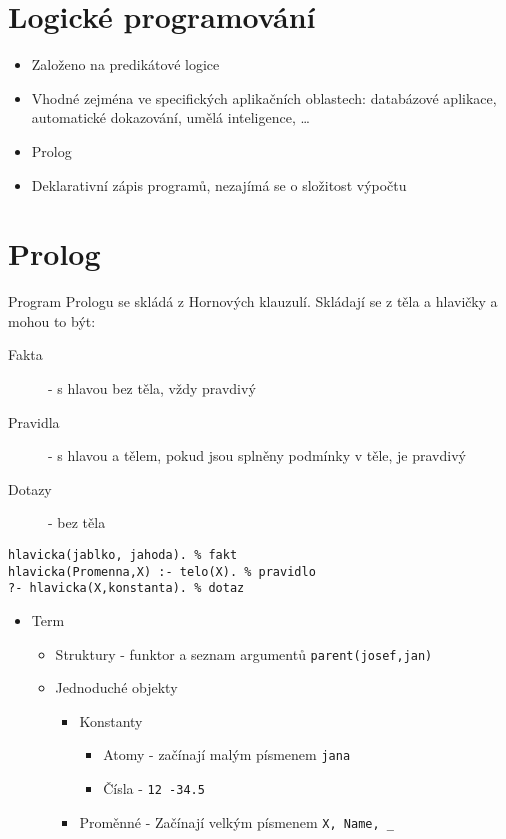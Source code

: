 \documentclass{szzclass}
\begin{document}
\section{Logické programování}

\begin{itemize}
\item Založeno na predikátové logice
\item Vhodné zejména ve specifických aplikačních oblastech: databázové aplikace, automatické dokazování, umělá inteligence, \dots
\item Prolog
\item Deklarativní zápis programů, nezajímá se o složitost výpočtu
\end{itemize}

\section{Prolog}
Program Prologu se skládá z Hornových klauzulí. Skládají se z těla a hlavičky a mohou to být:
\begin{description}
\item[Fakta] - s hlavou bez těla, vždy pravdivý
\item[Pravidla] - s hlavou a tělem, pokud jsou splněny podmínky v těle, je pravdivý
\item[Dotazy] - bez těla
\end{description}

\begin{verbatim}
hlavicka(jablko, jahoda). % fakt
hlavicka(Promenna,X) :- telo(X). % pravidlo
?- hlavicka(X,konstanta). % dotaz
\end{verbatim}

\begin{itemize}
\item Term
  \begin{itemize}
  \item Struktury - funktor a seznam argumentů \texttt{parent(josef,jan)}
  \item Jednoduché objekty
    \begin{itemize}
    \item Konstanty
      \begin{itemize}
      \item Atomy - začínají malým písmenem \texttt{jana}
      \item Čísla - \texttt{12 -34.5}
      \end{itemize}
    \item Proměnné - Začínají velkým písmenem \texttt{X, Name, _}
    \end{itemize}
  \end{itemize}
\end{itemize}
\end{document}
